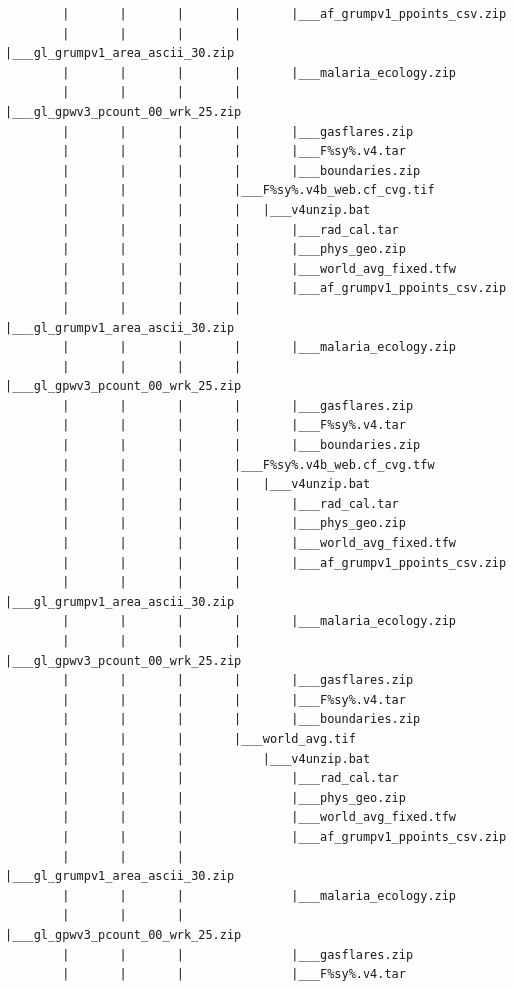 \documentclass[]{book}
\begin{document}
\begin{verbatim}
        |       |       |       |       |___af_grumpv1_ppoints_csv.zip
        |       |       |       |       |___gl_grumpv1_area_ascii_30.zip
        |       |       |       |       |___malaria_ecology.zip
        |       |       |       |       |___gl_gpwv3_pcount_00_wrk_25.zip
        |       |       |       |       |___gasflares.zip
        |       |       |       |       |___F%sy%.v4.tar
        |       |       |       |       |___boundaries.zip
        |       |       |       |___F%sy%.v4b_web.cf_cvg.tif
        |       |       |       |   |___v4unzip.bat
        |       |       |       |       |___rad_cal.tar
        |       |       |       |       |___phys_geo.zip
        |       |       |       |       |___world_avg_fixed.tfw
        |       |       |       |       |___af_grumpv1_ppoints_csv.zip
        |       |       |       |       |___gl_grumpv1_area_ascii_30.zip
        |       |       |       |       |___malaria_ecology.zip
        |       |       |       |       |___gl_gpwv3_pcount_00_wrk_25.zip
        |       |       |       |       |___gasflares.zip
        |       |       |       |       |___F%sy%.v4.tar
        |       |       |       |       |___boundaries.zip
        |       |       |       |___F%sy%.v4b_web.cf_cvg.tfw
        |       |       |       |   |___v4unzip.bat
        |       |       |       |       |___rad_cal.tar
        |       |       |       |       |___phys_geo.zip
        |       |       |       |       |___world_avg_fixed.tfw
        |       |       |       |       |___af_grumpv1_ppoints_csv.zip
        |       |       |       |       |___gl_grumpv1_area_ascii_30.zip
        |       |       |       |       |___malaria_ecology.zip
        |       |       |       |       |___gl_gpwv3_pcount_00_wrk_25.zip
        |       |       |       |       |___gasflares.zip
        |       |       |       |       |___F%sy%.v4.tar
        |       |       |       |       |___boundaries.zip
        |       |       |       |___world_avg.tif
        |       |       |           |___v4unzip.bat
        |       |       |               |___rad_cal.tar
        |       |       |               |___phys_geo.zip
        |       |       |               |___world_avg_fixed.tfw
        |       |       |               |___af_grumpv1_ppoints_csv.zip
        |       |       |               |___gl_grumpv1_area_ascii_30.zip
        |       |       |               |___malaria_ecology.zip
        |       |       |               |___gl_gpwv3_pcount_00_wrk_25.zip
        |       |       |               |___gasflares.zip
        |       |       |               |___F%sy%.v4.tar

\end{verbatim}
\end{document}
